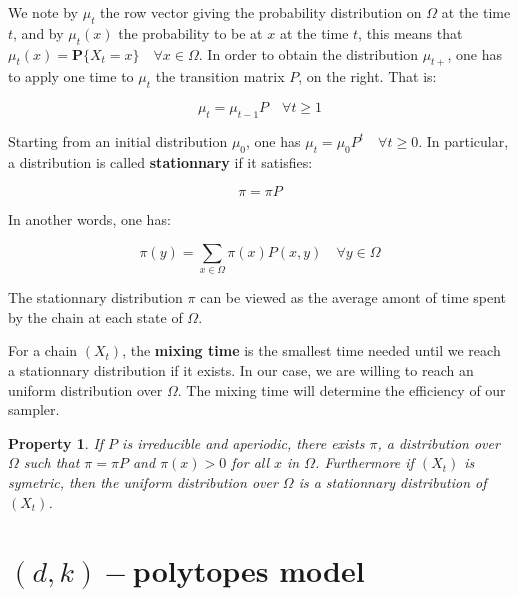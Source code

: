 \documentclass[11pt]{article}
\newtheorem{propriete}{Property}[subsection]
\begin{document}
We note by $\mu_t$ the row vector giving the probability distribution on $\Omega$ at the time $t$, and by $\mu_t(x)$ the probability to be at $x$ at the time $t$, this means that $\mu_t(x) = \mathbf{P}\{X_t = x \} \quad \forall x \in \Omega$. In order to obtain the distribution $\mu_{t+}$, one has to apply one time to $\mu_t$ the transition matrix $P$, on the right. That is:

\begin{equation}
  \mu_t = \mu_{t-1}P \quad \forall t\geq{1}
\end{equation}

Starting from an initial distribution $\mu_0$, one has $\mu_t = \mu_0P^t \quad \forall t\geq{0}$. In particular, a distribution is called \textbf{stationnary} if it satisfies:

\begin{equation}
  \pi = \pi P
\end{equation}

In another words, one has:

\begin{equation}
  \pi(y) = \sum_{x \in \Omega} \pi(x)P(x,y) \quad \forall y \in \Omega
\end{equation}

The stationnary distribution $\pi$ can be viewed as the average amont of time spent by the chain at each state of $\Omega$.

For a chain $(X_t)$, the \textbf{mixing time} is the smallest time needed until we reach a stationnary distribution if it exists. In our case, we are willing to reach an uniform distribution over $\Omega$. The mixing time will determine the efficiency of our sampler.

\begin{propriete}\label{prop:irr_ap}
  If $P$ is irreducible and aperiodic, there exists $\pi$, a distribution over $\Omega$ such that $\pi = \pi P$ and $\pi(x)>0$ for all $x$ in $\Omega$. Furthermore if $(X_t)$ is symetric, then the uniform distribution over $\Omega$ is a stationnary distribution of $(X_t)$.
\end{propriete}


\section{$(d,k)-$polytopes model}
\end{document}
